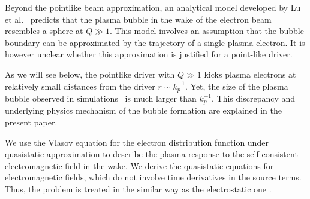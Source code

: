\documentclass[twocolumn,showpacs,aip]{revtex4}
\begin{document}

Beyond the pointlike beam approximation, an analytical model  developed by Lu et al.~\cite{Lu_theory_2006}  predicts that  the plasma bubble in the wake of the  electron beam   resembles  a sphere at   $Q\gg 1$. This model involves an assumption that the bubble boundary can be approximated by the trajectory of a single plasma electron. It is however unclear whether  this  approximation is justified for a point-like driver. 

As we will see below, the pointlike driver with $Q\gg 1$ kicks plasma electrons at relatively small distances  from the driver $r\sim k_p^{-1}$. Yet, the size of the plasma bubble observed in simulations~\cite{Rosenzweig_2004}  is much larger than $k_p^{-1}$. 
This discrepancy and underlying physics mechanism of the bubble formation are explained in the present paper.
%
%
%




We  use the Vlasov equation for the electron distribution function 
under  quasistatic approximation  to describe the plasma response to the self-consistent electromagnetic field in the wake. We derive the quasistatic equations for  electromagnetic fields, which do not involve time derivatives in the source terms.  Thus, the problem is treated in the  similar way as    the   electrostatic one \cite{Birdsall_book}. 
%
%
\end{document}
